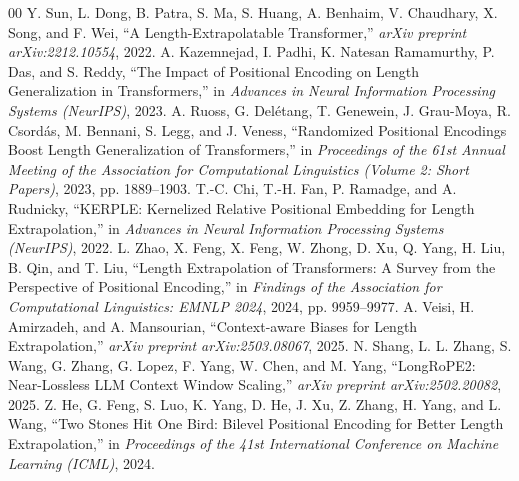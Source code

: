 \documentclass[conference]{IEEEtran}
\begin{document}
\begin{thebibliography}{00}
 Y. Sun, L. Dong, B. Patra, S. Ma, S. Huang, A. Benhaim, V. Chaudhary, X. Song, and F. Wei, ``A Length-Extrapolatable Transformer,'' \emph{arXiv preprint arXiv:2212.10554}, 2022.
 A. Kazemnejad, I. Padhi, K. Natesan Ramamurthy, P. Das, and S. Reddy, ``The Impact of Positional Encoding on Length Generalization in Transformers,'' in \emph{Advances in Neural Information Processing Systems (NeurIPS)}, 2023.
 A. Ruoss, G. Del\'{e}tang, T. Genewein, J. Grau-Moya, R. Csord\'{a}s, M. Bennani, S. Legg, and J. Veness, ``Randomized Positional Encodings Boost Length Generalization of Transformers,'' in \emph{Proceedings of the 61st Annual Meeting of the Association for Computational Linguistics (Volume 2: Short Papers)}, 2023, pp. 1889--1903.
 T.-C. Chi, T.-H. Fan, P. Ramadge, and A. Rudnicky, ``KERPLE: Kernelized Relative Positional Embedding for Length Extrapolation,'' in \emph{Advances in Neural Information Processing Systems (NeurIPS)}, 2022.
 L. Zhao, X. Feng, X. Feng, W. Zhong, D. Xu, Q. Yang, H. Liu, B. Qin, and T. Liu, ``Length Extrapolation of Transformers: A Survey from the Perspective of Positional Encoding,'' in \emph{Findings of the Association for Computational Linguistics: EMNLP 2024}, 2024, pp. 9959--9977.
 A. Veisi, H. Amirzadeh, and A. Mansourian, ``Context-aware Biases for Length Extrapolation,'' \emph{arXiv preprint arXiv:2503.08067}, 2025.
 N. Shang, L. L. Zhang, S. Wang, G. Zhang, G. Lopez, F. Yang, W. Chen, and M. Yang, ``LongRoPE2: Near-Lossless LLM Context Window Scaling,'' \emph{arXiv preprint arXiv:2502.20082}, 2025.
 Z. He, G. Feng, S. Luo, K. Yang, D. He, J. Xu, Z. Zhang, H. Yang, and L. Wang, ``Two Stones Hit One Bird: Bilevel Positional Encoding for Better Length Extrapolation,'' in \emph{Proceedings of the 41st International Conference on Machine Learning (ICML)}, 2024.
\end{thebibliography}
\end{document}
